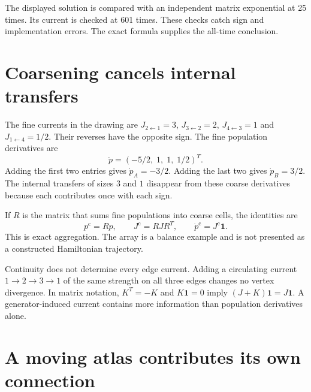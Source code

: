 The displayed solution is compared with an independent matrix exponential at 25 times. Its current is checked at 601 times. These checks catch sign and implementation errors. The exact formula supplies the all-time conclusion.



\clearpage
\section{Coarsening cancels internal transfers}

The fine currents in the drawing are $J_{2\leftarrow1}=3$, $J_{3\leftarrow2}=2$, $J_{4\leftarrow3}=1$ and $J_{1\leftarrow4}=1/2$. Their reverses have the opposite sign. The fine population derivatives are
\[
\dot p=(-5/2,\;1,\;1,\;1/2)^T.
\]
Adding the first two entries gives $\dot p_A=-3/2$. Adding the last two gives $\dot p_B=3/2$. The internal transfers of sizes $3$ and $1$ disappear from these coarse derivatives because each contributes once with each sign.

If $R$ is the matrix that sums fine populations into coarse cells, the identities are
\[
p^{\mathrm c}=Rp,\qquad J^{\mathrm c}=RJR^T,\qquad
\dot p^{\mathrm c}=J^{\mathrm c}\mathbf1.
\]
This is exact aggregation. The array is a balance example and is not presented as a constructed Hamiltonian trajectory.

Continuity does not determine every edge current. Adding a circulating current $1\to2\to3\to1$ of the same strength on all three edges changes no vertex divergence. In matrix notation, $K^T=-K$ and $K\mathbf1=0$ imply $(J+K)\mathbf1=J\mathbf1$. A generator-induced current contains more information than population derivatives alone.



\clearpage
\section{A moving atlas contributes its own connection}


